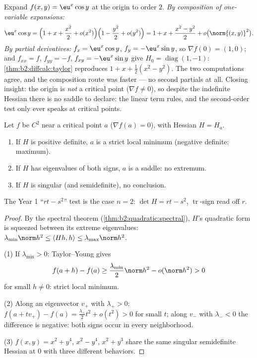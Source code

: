 \begin{example}\label{ex:b2:diffcalc:taylortwoways}
Expand $f(x, y) = \eu^x\cos y$ at the origin to order $2$.
\emph{By composition of one-variable expansions:}
\[
\eu^x\cos y = \Bigl(1 + x + \frac{x^2}{2} +
o(x^2)\Bigr)\Bigl(1 - \frac{y^2}{2} + o(y^2)\Bigr)
= 1 + x + \frac{x^2 - y^2}{2} + o\bigl(\norm{(x,y)}^2\bigr) .
\]
\emph{By partial derivatives:} $f_x = \eu^x\cos y$, $f_y =
-\eu^x\sin y$, so $\nabla f(0) = (1, 0)$; and $f_{xx} = f$,
$f_{yy} = -f$, $f_{xy} = -\eu^x\sin y$ give $H_0 =
\operatorname{diag}(1, -1)$: \cref{thm:b2:diffcalc:taylor}
reproduces $1 + x + \frac12(x^2 - y^2)$. The two computations
agree, and the composition route was faster --- no second
partials at all. Closing insight: the origin is \emph{not} a
critical point ($\nabla f \neq 0$), so despite the indefinite
Hessian there is no saddle to declare: the linear term rules,
and the second-order test only ever speaks at critical
points.
\end{example}

\begin{theorem}\label{thm:b2:diffcalc:extrema}
Let $f$ be $C^2$ near a critical point $a$ ($\nabla f(a) = 0$),
with Hessian $H = H_a$.
\begin{enumerate}
  \item If $H$ is positive definite, $a$ is a strict local minimum
        (negative definite: maximum).
  \item If $H$ has eigenvalues of both signs, $a$ is a saddle: no
        extremum.
  \item If $H$ is singular (and semidefinite), no conclusion.
\end{enumerate}
The Year 1 ``$rt - s^2$'' test is the case $n = 2$: $\det H = rt -
s^2$, $\operatorname{tr}$-sign read off $r$.
\end{theorem}

\begin{proof}
By the spectral theorem (\cref{thm:b2:quadratic:spectral}), $H$'s
quadratic form is squeezed between its extreme eigenvalues:
$\lambda_{\min}\norm h^2 \leq \langle Hh, h\rangle \leq
\lambda_{\max}\norm h^2$.

(1) If $\lambda_{\min} > 0$: Taylor--Young gives
\[
f(a + h) - f(a) \geq \frac{\lambda_{\min}}{2}\norm h^2 -
o(\norm h^2) > 0
\]
for small $h \neq 0$: strict local minimum.

(2) Along an eigenvector $v_+$ with $\lambda_+ > 0$: $f(a + tv_+) -
f(a) = \frac{\lambda_+}{2}t^2 + o(t^2) > 0$ for small $t$; along
$v_-$ with $\lambda_- < 0$ the difference is negative: both signs
occur in every neighborhood.

(3) $f(x,y) = x^2 + y^4$, $x^2 - y^4$, $x^2 + y^3$ share the same
singular semidefinite Hessian at $0$ with three different
behaviors.
\end{proof}

